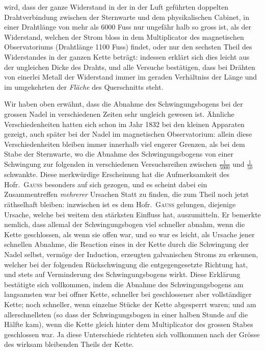wird, dass der ganze Widerstand in der in der Luft geführten doppelten Drahtverbindung zwischen der Sternwarte und dem physikalischen Cabinet, in einer Drahtlänge von mehr als 6000 Fuss nur ungefähr halb so gross ist, als der Widerstand, welchen der Strom bloss in dem Multiplicator des magnetischen Observatoriums (Drahtlänge 1100 Fuss) findet, oder nur den sechsten Theil des Widerstandes in der ganzen Kette beträgt: indessen erklärt sich dies leicht aus der ungleichen Dicke des Drahts, und alle Versuche bestätigen, dass bei Drähten von einerlei Metall der Widerstand immer im geraden Verhältniss der Länge und im umgekehrten der \textit{Fläche} des Querschnitts steht.

Wir haben oben erwähnt, dass die Abnahme des Schwingungsbogens bei der grossen Nadel in verschiedenen Zeiten sehr ungleich gewesen ist. Ähnliche Verschiedenheiten hatten sich schon im Jahr 1832 bei den kleinen Apparaten gezeigt, auch später bei der Nadel im magnetischen Observatorium: allein diese Verschiedenheiten bleiben immer innerhalb viel engerer Grenzen, als bei dem Stabe der Sternwarte, wo die Abnahme des Schwingungsbogens von einer Schwingung zur folgenden in verschiedenen Versuchsreihen zwischen $\frac{1}{5000}$ und $\frac{1}{50}$ schwankte. Diese merkwürdige Erscheinung hat die Aufmerksamkeit des Hofr.\ \textsc{Gauss} besonders auf sich gezogen, und es scheint dabei ein Zusammentreffen \textit{mehrerer} Ursachen Statt zu finden, die zum Theil noch jetzt räthselhaft bleiben: inzwischen ist es dem Hofr.\ \textsc{Gauss} gelungen, diejenige Ursache, welche bei weitem den stärksten Einfluss hat, auszumitteln. Er bemerkte nemlich, dass allemal der Schwingungsbogen viel schneller abnahm, wenn die Kette geschlossen, als wenn sie offen war, und so war es leicht, als Ursache jener schnellen Abnahme, die Reaction eines in der Kette durch die Schwingung der Nadel selbst, vermöge der Induction, erzeugten galvanischen Stroms zu erkennen, welcher bei der folgenden Rückschwingung die entgegengesetzte Richtung hat, und stets auf Verminderung des Schwingungsbogens wirkt. Diese Erklärung bestätigte sich vollkommen, indem die Abnahme des Schwingungsbogens am langsamsten war bei offner Kette, schneller bei geschlossener aber vollständiger Kette; noch schneller, wenn einzelne Stücke der Kette abgesperrt waren; und am allerschnellsten (so dass der Schwingungsbogen in einer halben Stunde auf die Hälfte kam), wenn die Kette gleich hinter dem Multiplicator des grossen Stabes geschlossen war. Ja diese Unterschiede richteten sich vollkommen nach der Grösse des wirksam bleibenden Theils der Kette.

